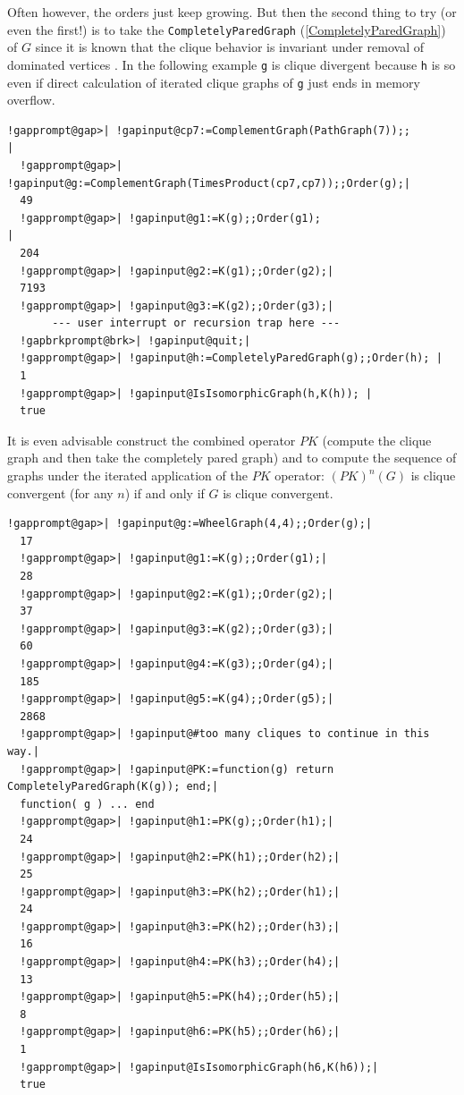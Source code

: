 \documentclass[a4paper,11pt]{report}
\begin{document}
{{Often however, the orders just keep growing. But then the second thing to try
(or even the first!) is to take the \texttt{CompletelyParedGraph} (\ref{CompletelyParedGraph}) of $G$ since it is known that the clique behavior is invariant under removal of
dominated vertices \cite{FNP04}. In the following example \texttt{g} is clique divergent because \texttt{h} is so even if direct calculation of iterated clique graphs of \texttt{g} just ends in memory overflow. 

 
\begin{Verbatim}[commandchars=!@|,fontsize=\small,frame=single,label=Example]
  !gapprompt@gap>| !gapinput@cp7:=ComplementGraph(PathGraph(7));;       |
  !gapprompt@gap>| !gapinput@g:=ComplementGraph(TimesProduct(cp7,cp7));;Order(g);|
  49
  !gapprompt@gap>| !gapinput@g1:=K(g);;Order(g1);                                 |
  204
  !gapprompt@gap>| !gapinput@g2:=K(g1);;Order(g2);|
  7193
  !gapprompt@gap>| !gapinput@g3:=K(g2);;Order(g3);|
       --- user interrupt or recursion trap here ---
  !gapbrkprompt@brk>| !gapinput@quit;|
  !gapprompt@gap>| !gapinput@h:=CompletelyParedGraph(g);;Order(h); |
  1
  !gapprompt@gap>| !gapinput@IsIsomorphicGraph(h,K(h)); |
  true
\end{Verbatim}
 

It is even advisable construct the combined operator $PK$ (compute the clique graph and then take the completely pared graph) and to
compute the sequence of graphs under the iterated application of the $PK$ operator: $(PK)^n(G)$ is clique convergent (for any $n$) if and only if $G$ is clique convergent. 

 
\begin{Verbatim}[commandchars=!@|,fontsize=\small,frame=single,label=Example]
  !gapprompt@gap>| !gapinput@g:=WheelGraph(4,4);;Order(g);|
  17
  !gapprompt@gap>| !gapinput@g1:=K(g);;Order(g1);|
  28
  !gapprompt@gap>| !gapinput@g2:=K(g1);;Order(g2);|
  37
  !gapprompt@gap>| !gapinput@g3:=K(g2);;Order(g3);|
  60
  !gapprompt@gap>| !gapinput@g4:=K(g3);;Order(g4);|
  185
  !gapprompt@gap>| !gapinput@g5:=K(g4);;Order(g5);|
  2868
  !gapprompt@gap>| !gapinput@#too many cliques to continue in this way.|
  !gapprompt@gap>| !gapinput@PK:=function(g) return CompletelyParedGraph(K(g)); end;|
  function( g ) ... end
  !gapprompt@gap>| !gapinput@h1:=PK(g);;Order(h1);|
  24
  !gapprompt@gap>| !gapinput@h2:=PK(h1);;Order(h2);|
  25
  !gapprompt@gap>| !gapinput@h3:=PK(h2);;Order(h1);|
  24
  !gapprompt@gap>| !gapinput@h3:=PK(h2);;Order(h3);|
  16
  !gapprompt@gap>| !gapinput@h4:=PK(h3);;Order(h4);|
  13
  !gapprompt@gap>| !gapinput@h5:=PK(h4);;Order(h5);|
  8
  !gapprompt@gap>| !gapinput@h6:=PK(h5);;Order(h6);|
  1
  !gapprompt@gap>| !gapinput@IsIsomorphicGraph(h6,K(h6));|
  true
\end{Verbatim}
 

}}
\end{document}
